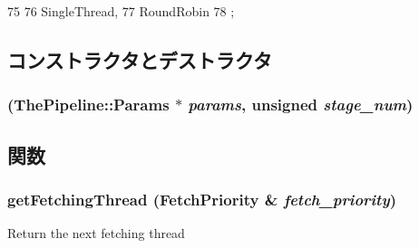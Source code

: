 \begin{DoxyCode}
75                        {
76         SingleThread,
77         RoundRobin
78     };
\end{DoxyCode}


\subsection{コンストラクタとデストラクタ}
\hypertarget{classFirstStage_a11c6e3fc6cdc379408dffb110f0fb5e6}{
\subsubsection[{FirstStage}]{ ({\bf ThePipeline::Params} $\ast$ {\em params}, \/  unsigned {\em stage\_\-num})}}
\label{classFirstStage_a11c6e3fc6cdc379408dffb110f0fb5e6}


\subsection{関数}
\hypertarget{classFirstStage_a4a20466270bc79a695af63ea67a35576}{
\subsubsection[{getFetchingThread}]{ getFetchingThread ({\bf FetchPriority} \& {\em fetch\_\-priority})}}
\label{classFirstStage_a4a20466270bc79a695af63ea67a35576}
Return the next fetching thread 


